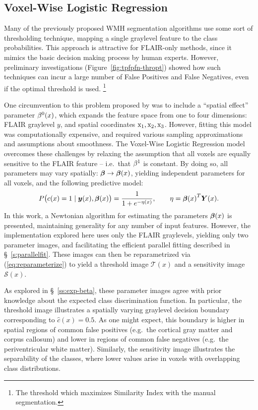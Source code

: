 \subsection{Voxel-Wise Logistic Regression}
Many of the previously proposed WMH segmentation algorithms use some sort of thresholding technique,
mapping a single graylevel feature to the class probabilities.
This approach is attractive for FLAIR-only methods,
since it mimics the basic decision making process by human experts.
However, preliminary investigations (Figure~\ref{fig:tpfpfn-thropt}) showed how
such techniques can incur a large number of False Positives and False Negatives,
even if the optimal threshold is used.%
\footnote{The threshold which maximizes Similarity Index with the manual segmentation.}
\par
One circumvention to this problem proposed by \citeauthor{Schmidt2017a}
was to include a ``spatial effect'' parameter $\beta^0(x)$,
which expands the feature space from one to four dimensions:
FLAIR graylevel $y$, and spatial coordinates $\mathrm{x}_1,\mathrm{x}_2,\mathrm{x}_3$.
However, fitting this model was computationally expensive,
and required various sampling approximations and assumptions about smoothness.
The Voxel-Wise Logistic Regression model overcomes these challenges
by relaxing the assumption that all voxels are equally sensitive to the FLAIR feature
-- i.e.\ that $\beta^1$ is constant.
By doing so, all parameters may vary spatially: $\bm{\beta} \rightarrow \bm{\beta}(x)$,
yielding independent parameters for all voxels,
and the following predictive model:
\begin{equation}
P\big(c(x)=1\mid\by(x),\bb(x)\big) = \frac{1}{1+e^{-\eta(x)}},\qquad\eta = {\bb(x)}^T\bm{Y}(x).%
\label{eq:eq:vlrmodel-conc}
\end{equation}
In this work, a Newtonian algorithm for estimating the parameters $\bm{\beta}(x)$ is presented,
maintaining generality for any number of input features.
However, the implementation explored here uses only the FLAIR graylevels,
yielding only two parameter images,
and facilitating the efficient parallel fitting described in \S~\ref{s:parallelfit}.
These images can then be reparametrized via (\ref{eq:reparameterize}) to yield
a threshold image $\mathcal{T}(x)$
and a sensitivity image $\mathcal{S}(x)$.
\par
As explored in \S~\ref{ss:exp-beta}, these parameter images
agree with prior knowledge about the expected class discrimination function.
In particular, the threshold image illustrates a spatially varying graylevel decision boundary
corresponding to $\hat{c}(x) = 0.5$.
As one might expect, this boundary is higher in spatial regions of common false positives
(e.g.\ the cortical gray matter and corpus callosum)
and lower in regions of common false negatives
(e.g.\ the periventricular white matter).
Similarly, the sensitivity image illustrates the separability of the classes,
where lower values arise in voxels with overlapping class distributions.
